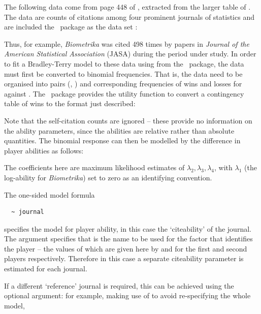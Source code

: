 The following data come from page 448 of \citet{agre:02}, extracted from the larger
table of \citet{stig:94}.  The data are counts of citations among four prominent
journals of statistics and are included the \BT\ package as the data set
:

\Rcodeplaceholder{}

\Rcodeplaceholder{}

\Rcodeplaceholder{}

Thus, for example, \emph{Biometrika} was cited 498 times by papers in
\emph{Journal of the American Statistical Association} (JASA) during the period under study.  In order to fit a Bradley-Terry
model to these data using  from the \BT\ package, the data must
first be converted to binomial frequencies. That is, the data need to be
organised into pairs (, ) and corresponding
frequencies of wins and losses for  against
. The \BT\ package provides the utility function
 to convert a contingency table of
wins to the format just described:

\Rcodeplaceholder{}

Note that the self-citation counts are ignored -- these provide no
information on the ability parameters, since the abilities are relative rather than
absolute quantities.
The binomial response can then be modelled by the difference in player abilities
as follows:

\Rcodeplaceholder{}

The coefficients here are maximum likelihood estimates of $\lambda_2, \lambda_3,
\lambda_4$, with $\lambda_1$ (the log-ability for \emph{Biometrika}) set to zero
as an identifying convention.

The one-sided model formula
\begin{verbatim}
  ~ journal
\end{verbatim}
specifies the model for player ability, in this case the `citeability' of the
journal. The  argument specifies that  is the
name to be used for the factor that identifies the player -- the values of which
are given here by  and  for the first and
second players respectively. Therefore in this case a separate
citeability parameter is estimated for each journal.

If a different `reference' journal is required, this can be achieved using the
optional  argument: for
example, making use of  to avoid re-specifying the whole model,


